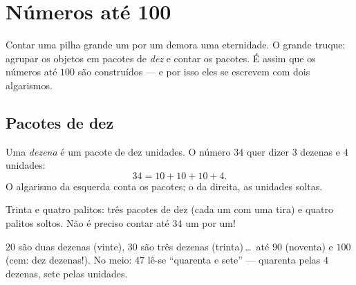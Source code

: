 \chapter{Números até 100}\label{ch:g1:tens}

Contar uma pilha grande um por um demora uma eternidade. O grande
truque: agrupar os objetos em pacotes de \emph{dez} e contar os
pacotes. É assim que os números até $100$ são construídos --- e por
isso eles se escrevem com dois algarismos.

\section{Pacotes de dez}

\begin{definition}\label{def:g1:tens:def}
Uma \emph{dezena} é um pacote de dez unidades. O número $34$ quer
dizer $3$ dezenas e $4$ unidades:
\[
34 = 10 + 10 + 10 + 4 .
\]
O algarismo da esquerda conta os pacotes; o da direita, as unidades
soltas.
\end{definition}

\begin{omfigure}

{\small Trinta e quatro palitos: três pacotes de dez (cada um com uma
tira) e quatro palitos soltos. Não é preciso contar até $34$ um por
um!}
\end{omfigure}

\begin{example}\label{ex:g1:tens:reading}
$20$ são duas dezenas (vinte), $30$ são três dezenas
(trinta)\,\dots\ até $90$ (noventa) e $100$ (cem: dez dezenas!). No
meio: $47$ lê-se ``quarenta e sete'' --- quarenta pelas $4$ dezenas,
sete pelas unidades.
\end{example}

